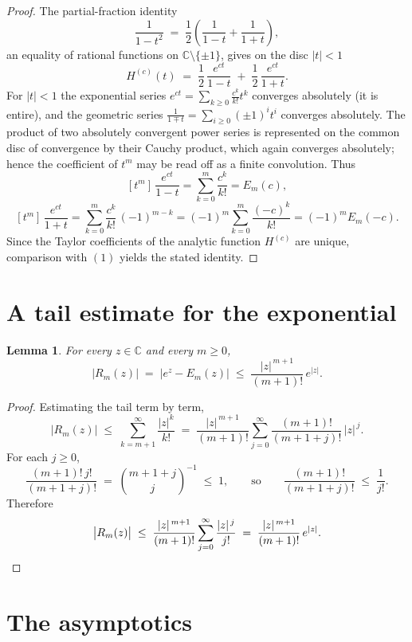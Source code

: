 \documentclass[11pt, fleqn]{amsart}
\newtheorem{lemma}[theorem]{Lemma}
\theoremstyle{remark}
\begin{document}
\begin{proof}
The partial-fraction identity
\[
\frac{1}{1-t^2}\;=\;\frac12\!\left(\frac{1}{1-t}+\frac{1}{1+t}\right),
\]
an equality of rational functions on $\mathbb{C}\setminus\{\pm1\}$, gives on the
disc $|t|<1$
\[
H^{(c)}(t)\;=\;\frac12\,\frac{e^{ct}}{1-t}\;+\;\frac12\,\frac{e^{ct}}{1+t}.
\]
For $|t|<1$ the exponential series $e^{ct}=\sum_{k\ge0}\frac{c^k}{k!}t^k$ converges
absolutely (it is entire), and the geometric series
$\frac{1}{1\mp t}=\sum_{i\ge0}(\pm1)^{i}t^{i}$ converges absolutely. The product of
two absolutely convergent power series is represented on the common disc of
convergence by their Cauchy product, which again converges absolutely; hence the
coefficient of $t^m$ may be read off as a finite convolution. Thus
\[
[t^m]\,\frac{e^{ct}}{1-t}=\sum_{k=0}^{m}\frac{c^{k}}{k!}=E_m(c),
\]
\[
[t^m]\,\frac{e^{ct}}{1+t}=\sum_{k=0}^{m}\frac{c^{k}}{k!}\,(-1)^{m-k}
=(-1)^m\sum_{k=0}^{m}\frac{(-c)^{k}}{k!}=(-1)^m E_m(-c).
\]
Since the Taylor coefficients of the analytic function $H^{(c)}$ are unique,
comparison with $(1)$ yields the stated identity.
\end{proof}

\section{A tail estimate for the exponential}

\begin{lemma}\label{lem:tail}
For every $z\in\mathbb{C}$ and every $m\ge 0$,
\[
\bigl|R_m(z)\bigr|\;=\;\bigl|e^{z}-E_m(z)\bigr|\;\le\;\frac{|z|^{\,m+1}}{(m+1)!}\,e^{|z|}.
\]
\end{lemma}

\begin{proof}
Estimating the tail term by term,
\[
\bigl|R_m(z)\bigr|\;\le\;\sum_{k=m+1}^{\infty}\frac{|z|^{k}}{k!}
\;=\;\frac{|z|^{\,m+1}}{(m+1)!}\sum_{j=0}^{\infty}\frac{(m+1)!}{(m+1+j)!}\,|z|^{\,j}.
\]
For each $j\ge0$,
\[
\frac{(m+1)!\,j!}{(m+1+j)!}\;=\;\binom{m+1+j}{j}^{-1}\;\le\;1,
\qquad\text{so}\qquad
\frac{(m+1)!}{(m+1+j)!}\;\le\;\frac{1}{j!}.
\]
Therefore
\[
\bigl|R_m(z)\bigr|\;\le\;\frac{|z|^{\,m+1}}{(m+1)!}\sum_{j=0}^{\infty}\frac{|z|^{\,j}}{j!}
\;=\;\frac{|z|^{\,m+1}}{(m+1)!}\,e^{|z|}. \qedhere
\]
\end{proof}

\section{The asymptotics}
\end{document}
